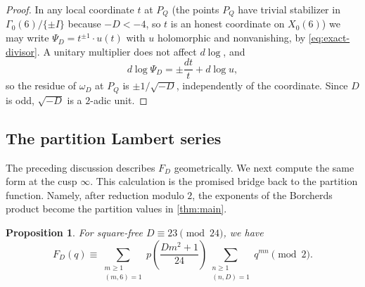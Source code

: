 \documentclass[11pt]{amsart}
\newtheorem{proposition}[theorem]{Proposition}
\theoremstyle{remark}
\numberwithin{equation}{section}
\begin{document}
\begin{proof}
 In any local coordinate $t$ at $P_Q$ (the points $P_Q$ have trivial
 stabilizer in $\Gamma_0(6)/\{\pm I\}$ because $-D<-4$, so $t$ is an honest
 coordinate on $X_0(6)$) we may write $\Psi_D=t^{\pm1}\cdot u(t)$ with $u$
 holomorphic and nonvanishing, by \eqref{eq:exact-divisor}.  A unitary
 multiplier does not affect $d\log$, and
 \[
  d\log\Psi_D=\pm\frac{dt}{t}+d\log u,
 \]
 so the residue of $\omega_D$ at $P_Q$ is $\pm1/\sqrt{-D}$, independently of
 the coordinate.  Since $D$ is odd, $\sqrt{-D}$ is a $2$-adic unit.
\end{proof}

\subsection{The partition Lambert series}

The preceding discussion describes $F_D$ geometrically.  We next compute
the same form at the cusp $\infty$.  This calculation is the promised bridge
back to the partition function.  Namely, after reduction modulo $2$, the exponents
of the Borcherds product become the partition values in \cref{thm:main}.

\begin{proposition}\label{prop:lambert}
 For square-free $D\equiv23\pmod{24}$, we have
 \begin{equation}\label{eq:lambert}
  F_D(q)\equiv
  \sum_{\substack{m\geq1\\(m,6)=1}}
  p\!\left(\frac{Dm^2+1}{24}\right)
  \sum_{\substack{n\geq1\\(n,D)=1}}q^{mn}
  \pmod2.
 \end{equation}
\end{proposition}
\end{document}
